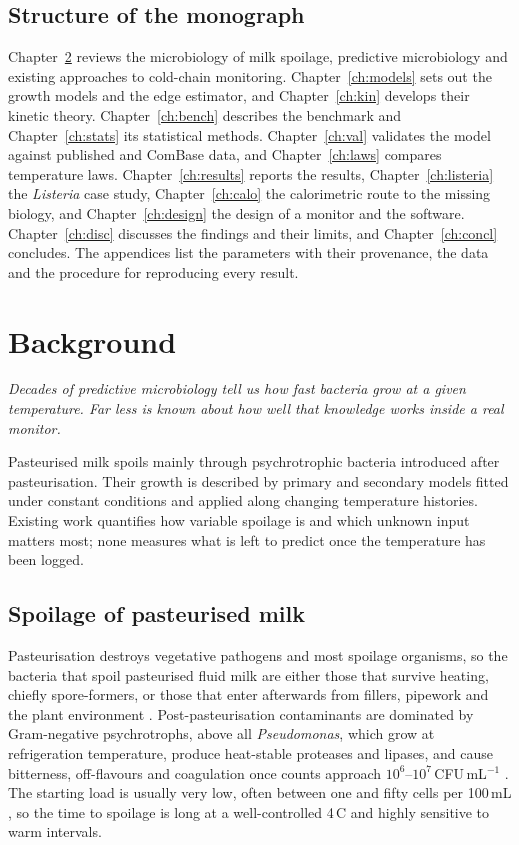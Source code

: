 \documentclass[11pt,a4paper,twoside,openany]{book}
\newcommand{\hook}[1]{{\noindent\fontsize{14}{20}\selectfont\itshape\color{dggrey}#1\par}\vspace{14pt}}
\newcommand{\degC}{\,\textdegree C}
\theoremstyle{plain}\newtheorem{proposition}{Proposition}\newtheorem{corollary}{Corollary}
\theoremstyle{definition}\newtheorem{definition}{Definition}[chapter]
\begin{document}
\section{Structure of the monograph}
Chapter~\ref{ch:background} reviews the microbiology of milk spoilage, predictive microbiology and existing approaches to cold-chain monitoring. Chapter~\ref{ch:models} sets out the growth models and the edge estimator, and Chapter~\ref{ch:kin} develops their kinetic theory. Chapter~\ref{ch:bench} describes the benchmark and Chapter~\ref{ch:stats} its statistical methods. Chapter~\ref{ch:val} validates the model against published and ComBase data, and Chapter~\ref{ch:laws} compares temperature laws. Chapter~\ref{ch:results} reports the results, Chapter~\ref{ch:listeria} the \textit{Listeria} case study, Chapter~\ref{ch:calo} the calorimetric route to the missing biology, and Chapter~\ref{ch:design} the design of a monitor and the software. Chapter~\ref{ch:disc} discusses the findings and their limits, and Chapter~\ref{ch:concl} concludes. The appendices list the parameters with their provenance, the data and the procedure for reproducing every result.

\chapter{Background}\label{ch:background}
\hook{Decades of predictive microbiology tell us how fast bacteria grow at a given temperature. Far less is known about how well that knowledge works inside a real monitor.}
\begin{summary}
Pasteurised milk spoils mainly through psychrotrophic bacteria introduced after pasteurisation. Their growth is described by primary and secondary models fitted under constant conditions and applied along changing temperature histories. Existing work quantifies how variable spoilage is and which unknown input matters most; none measures what is left to predict once the temperature has been logged.
\end{summary}
\section{Spoilage of pasteurised milk}
Pasteurisation destroys vegetative pathogens and most spoilage organisms, so the bacteria that spoil pasteurised fluid milk are either those that survive heating, chiefly spore-formers, or those that enter afterwards from fillers, pipework and the plant environment \cite{martin2021,ranieri2009}. Post-pasteurisation contaminants are dominated by Gram-negative psychrotrophs, above all \textit{Pseudomonas}, which grow at refrigeration temperature, produce heat-stable proteases and lipases, and cause bitterness, off-flavours and coagulation once counts approach $10^6$--$10^7$\,CFU\,mL$^{-1}$ \cite{martin2021}. The starting load is usually very low, often between one and fifty cells per 100\,mL \cite{martin2021}, so the time to spoilage is long at a well-controlled 4\degC{} and highly sensitive to warm intervals.
\end{document}
